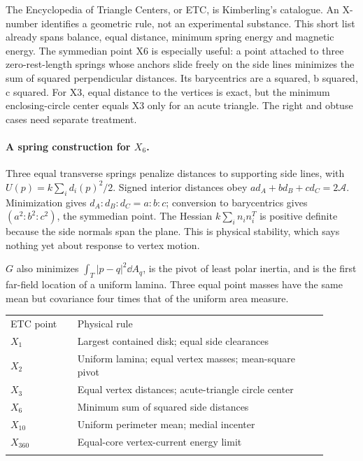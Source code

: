 \documentclass[11pt,oneside,openany]{book}
\newcommand{\toprule}{\hline\noalign{\vskip4pt}}
\newcommand{\midrule}{\noalign{\vskip3pt}\hline\noalign{\vskip4pt}}
\newcommand{\bottomrule}{\noalign{\vskip3pt}\hline}
\begin{document}
The Encyclopedia of Triangle Centers, or ETC, is Kimberling's catalogue. An X-number identifies a geometric rule, not an experimental substance. This short list already spans balance, equal distance, minimum spring energy and magnetic energy. The symmedian point X6 is especially useful: a point attached to three zero-rest-length springs whose anchors slide freely on the side lines minimizes the sum of squared perpendicular distances. Its barycentrics are a squared, b squared, c squared. For X3, equal distance to the vertices is exact, but the minimum enclosing-circle center equals X3 only for an acute triangle. The right and obtuse cases need separate treatment.



\paragraph{A spring construction for $X_6$.}
Three equal transverse springs penalize distances to supporting side
lines, with $U(p)=k\sum_i d_i(p)^2/2$. Signed interior distances obey
$ad_A+bd_B+cd_C=2\mathcal A$. Minimization gives
$d_A:d_B:d_C=a:b:c$; conversion to barycentrics gives
$(a^2:b^2:c^2)$, the symmedian point.
The Hessian $k\sum_i n_i n_i^T$ is positive definite because the
side normals span the plane. This is physical stability, which says
nothing yet about response to vertex motion.

$G$ also minimizes $\int_T|p-q|^2\dd A_q$, is the pivot of least polar
inertia, and is the first far-field location of a uniform lamina.
Three equal point masses have the same mean but covariance four
times that of the uniform area measure.



\begin{center}\small\begin{tabular}{p{0.19\linewidth}p{0.71\linewidth}}\toprule
ETC point & Physical rule\\\midrule
$X_1$ & Largest contained disk; equal side clearances\\
$X_2$ & Uniform lamina; equal vertex masses; mean-square pivot\\
$X_3$ & Equal vertex distances; acute-triangle circle center\\
$X_6$ & Minimum sum of squared side distances\\
$X_{10}$ & Uniform perimeter mean; medial incenter\\
$X_{360}$ & Equal-core vertex-current energy limit\\\bottomrule\end{tabular}\end{center}
\end{document}
